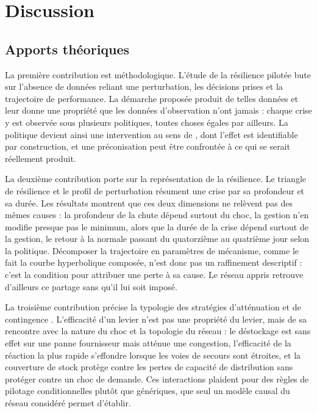 
\section{Discussion}
\label{sec:7}

\subsection{Apports théoriques}
\label{sec:7.1}

La première contribution est méthodologique. L'étude de la résilience pilotée bute sur l'absence de données reliant une perturbation, les décisions prises et la trajectoire de performance. La démarche proposée produit de telles données et leur donne une propriété que les données d'observation n'ont jamais : chaque crise y est observée sous plusieurs politiques, toutes choses égales par ailleurs. La politique devient ainsi une intervention au sens de \citet{pearl2009}, dont l'effet est identifiable par construction, et une préconisation peut être confrontée à ce qui se serait réellement produit.

La deuxième contribution porte sur la représentation de la résilience. Le triangle de résilience \citep{bruneau2003} et le profil de perturbation \citep{sheffi2005book} résument une crise par sa profondeur et sa durée. Les résultats montrent que ces deux dimensions ne relèvent pas des mêmes causes : la profondeur de la chute dépend surtout du choc, la gestion n'en modifie presque pas le minimum, alors que la durée de la crise dépend surtout de la gestion, le retour à la normale passant du quatorzième au quatrième jour selon la politique. Décomposer la trajectoire en paramètres de mécanisme, comme le fait la courbe hyperbolique composée, n'est donc pas un raffinement descriptif : c'est la condition pour attribuer une perte à sa cause. Le réseau appris retrouve d'ailleurs ce partage sans qu'il lui soit imposé.

La troisième contribution précise la typologie des stratégies d'atténuation et de contingence \citep{tomlin2006,chopra2004}. L'efficacité d'un levier n'est pas une propriété du levier, mais de sa rencontre avec la nature du choc et la topologie du réseau : le déstockage est sans effet sur une panne fournisseur mais atténue une congestion, l'efficacité de la réaction la plus rapide s'effondre lorsque les voies de secours sont étroites, et la couverture de stock protège contre les pertes de capacité de distribution sans protéger contre un choc de demande. Ces interactions plaident pour des règles de pilotage conditionnelles plutôt que génériques, que seul un modèle causal du réseau considéré permet d'établir.

